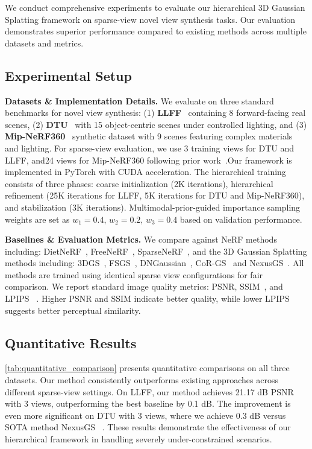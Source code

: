 \documentclass{article}
\begin{document}
  We conduct comprehensive experiments to evaluate our hierarchical 3D Gaussian Splatting framework on sparse-view novel view synthesis tasks. Our evaluation demonstrates superior performance compared to existing methods across multiple datasets and metrics.
  
  
  
  \subsection{Experimental Setup}
  
  \noindent\textbf{Datasets \& Implementation Details.} We evaluate on three standard benchmarks for novel view synthesis: (1) \textbf{LLFF}~\cite{mildenhall2019local} containing 8 forward-facing real scenes, (2) \textbf{DTU}~\cite{jensen2014large} with 15 object-centric scenes under controlled lighting, and (3) \textbf{Mip-NeRF360}~\cite{barron2022mip} synthetic dataset with 9 scenes featuring complex materials and lighting. For sparse-view evaluation, we use 3 training views for DTU and LLFF, and24 views for Mip-NeRF360 following prior work~\cite{zheng2025nexusgs, zhu2024fsgs}.Our framework is implemented in PyTorch with CUDA acceleration. The hierarchical training consists of three phases: coarse initialization (2K iterations), hierarchical refinement (25K iterations for LLFF, 5K iterations for DTU and Mip-NeRF360), and stabilization (3K iterations). Multimodal-prior-guided importance sampling weights are set as $w_1=0.4$, $w_2=0.2$, $w_3=0.4$ based on validation performance.
  
  \noindent\textbf{Baselines \& Evaluation Metrics.} We compare against NeRF methods including: DietNeRF~\cite{jain2021putting}, FreeNeRF~\cite{yang2023freenerf}, SparseNeRF~\cite{wang2023sparsenerf}, and the 3D Gaussian Splatting methods including: 3DGS~\cite{kerbl20233d}, FSGS~\cite{zhu2024fsgs}, DNGaussian~\cite{li2024dngaussian}, CoR-GS~\cite{zhang2024cor} and NexusGS~\cite{zheng2025nexusgs}. All methods are trained using identical sparse view configurations for fair comparison.
  We report standard image quality metrics: PSNR,  SSIM~\cite{wang2004image}, and LPIPS ~\cite{zhang2018unreasonable}.  Higher PSNR and SSIM indicate better quality, while lower LPIPS suggests better perceptual similarity.
  
  \subsection{Quantitative Results}
  \cref{tab:quantitative_comparison} presents quantitative comparisons on all three datasets. Our method consistently outperforms existing approaches across different sparse-view settings.
  On LLFF, our method achieves 21.17 dB PSNR with 3 views, outperforming the best baseline by 0.1 dB. The improvement is even more significant on DTU with 3 views, where we achieve 0.3 dB versus SOTA method NexusGS ~\cite{zheng2025nexusgs}. These results demonstrate the effectiveness of our hierarchical framework in handling severely under-constrained scenarios.
  
\end{document}
